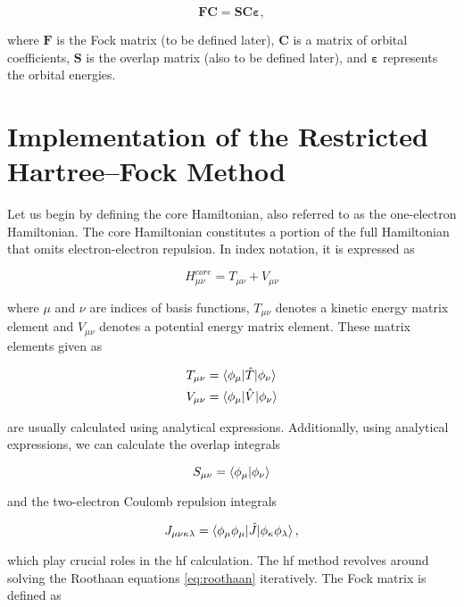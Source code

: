 \begin{equation}\label{eq:roothaan}
\mathbf{FC}=\mathbf{SC}\bm{\varepsilon},
\end{equation}

where \(\mathbf{F}\) is the Fock matrix (to be defined later), \(\mathbf{C}\) is a matrix of orbital coefficients, \(\mathbf{S}\) is the overlap matrix (also to be defined later), and \(\bm{\varepsilon}\) represents the orbital energies.

\section{Implementation of the Restricted Hartree--Fock Method}

Let us begin by defining the core Hamiltonian, also referred to as the one-electron Hamiltonian. The core Hamiltonian constitutes a portion of the full Hamiltonian that omits electron-electron repulsion. In index notation, it is expressed as

\begin{equation}\label{eq:hamiltonian}
H_{\mu\nu}^{core}=T_{\mu\nu}+V_{\mu\nu}
\end{equation}

where \(\mu\) and \(\nu\) are indices of basis functions, \(T_{\mu\nu}\) denotes a kinetic energy matrix element and \(V_{\mu\nu}\) denotes a potential energy matrix element. These matrix elements given as

\begin{align}
T_{\mu\nu}&=\braket{\phi_{\mu}|\hat{T}|\phi_{\nu}} \\
V_{\mu\nu}&=\braket{\phi_{\mu}|\hat{V}|\phi_{\nu}}
\end{align}

are usually calculated using analytical expressions. Additionally, using analytical expressions, we can calculate the overlap integrals

\begin{equation}\label{eq:overlap}
S_{\mu\nu}=\braket{\phi_{\mu}|\phi_{\nu}}
\end{equation}

and the two-electron Coulomb repulsion integrals

\begin{equation}\label{eq:coulomb}
J_{\mu\nu\kappa\lambda}=\braket{\phi_{\mu}\phi_{\mu}|\hat{J}|\phi_{\kappa}\phi_{\lambda}},
\end{equation}

which play crucial roles in the \acrshort{hf} calculation.\cite{10.1016/S0065-3276!08!60019-2} The \acrshort{hf} method revolves around solving the Roothaan equations \eqref{eq:roothaan} iteratively. The Fock matrix is defined as

